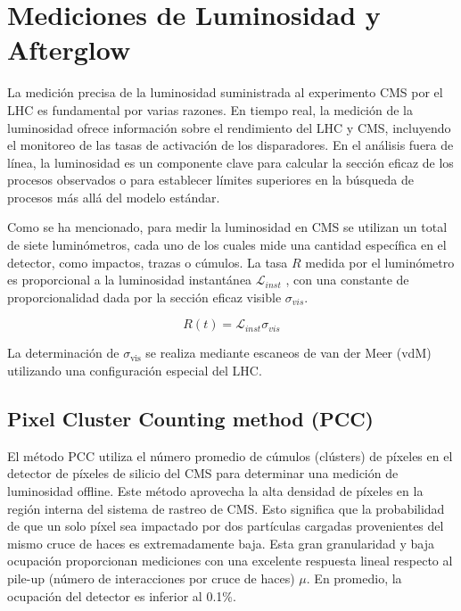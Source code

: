 \chapter{Mediciones de Luminosidad y Afterglow}
\label{ch3}

La medición precisa de la luminosidad suministrada al experimento CMS por el LHC es fundamental por varias razones. En tiempo real, la medición de la luminosidad ofrece información sobre el rendimiento del LHC y CMS, incluyendo el monitoreo de las tasas de activación de los disparadores. En el análisis fuera de línea, la luminosidad es un componente clave para calcular la sección eficaz de los procesos observados o para establecer límites superiores en la búsqueda de procesos más allá del modelo estándar.

Como se ha mencionado, para medir la luminosidad en CMS se utilizan un total de siete luminómetros, cada uno de los cuales mide una cantidad específica en el detector, como impactos, trazas o cúmulos. La tasa $R$ medida por el luminómetro es proporcional a la luminosidad instantánea $\mathcal{L}_{inst}$ , con una constante de proporcionalidad dada por la sección eficaz visible $\sigma_{vis}$.

\begin{equation}
R(t)=\mathcal{L}_{inst}\sigma_{vis}
\label{lumi_exp_gen}
\end{equation}

La determinación de \( \sigma_{\text{vis}} \) se realiza mediante escaneos de van der Meer (vdM) utilizando una configuración especial del LHC.

\section{Pixel Cluster Counting method (PCC)}

El método PCC utiliza el número promedio de cúmulos (clústers) de píxeles en el detector de píxeles de silicio del CMS para determinar una medición de luminosidad offline. Este método aprovecha la alta densidad de píxeles en la región interna del sistema de rastreo de CMS. Esto significa que la probabilidad de que un solo píxel sea impactado por dos partículas cargadas provenientes del mismo cruce de haces es extremadamente baja. Esta gran granularidad y baja ocupación proporcionan mediciones con una excelente respuesta lineal respecto al pile-up (número de interacciones por cruce de haces) $\mu$. En promedio, la ocupación del detector es inferior al 0.1\%\cite{lumi_precise_2015_2016}.\\

